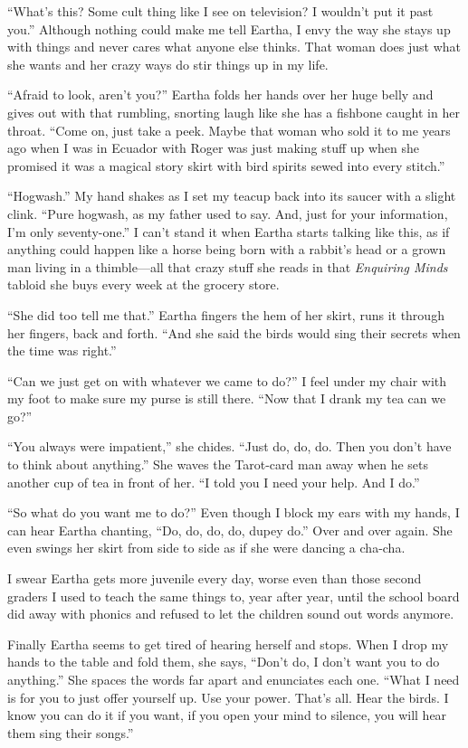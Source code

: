 \documentclass[twoside,10pt]{book}
\begin{document}
``What's this? Some cult thing like I see on television? I wouldn't put
it past you.'' Although nothing could make me tell Eartha, I envy the
way she stays up with things and never cares what any­one else thinks.
That woman does just what she wants and her crazy ways do stir things up
in my life.

``Afraid to look, aren't you?'' Eartha folds her hands over her huge
belly and gives out with that rumbling, snorting laugh like she has a
fishbone caught in her throat. ``Come on, just take a peek. Maybe that
woman who sold it to me years ago when I was in Ecuador with Roger was
just making stuff up when she promised it was a magical story skirt with
bird spirits sewed into every stitch.''

``Hogwash.'' My hand shakes as I set my teacup back into its saucer with
a slight clink. ``Pure hogwash, as my father used to say. And, just for
your information, I'm only seventy-one.'' I can't stand it when Eartha
starts talking like this, as if anything could happen like a horse being
born with a rabbit's head or a grown man living in a thimble---all that
crazy stuff she reads in that \emph{Enquiring Minds} tabloid she buys
every week at the grocery store.

``She did too tell me that.'' Eartha fingers the hem of her skirt, runs
it through her fingers, back and forth. ``And she said the birds would
sing their secrets when the time was right.''

``Can we just get on with whatever we came to do?'' I feel under my
chair with my foot to make sure my purse is still there. ``Now that I
drank my tea can we go?''

``You always were impatient,'' she chides. ``Just do, do, do. Then you
don't have to think about anything.'' She waves the Tarot-card man away
when he sets another cup of tea in front of her. ``I told you I need
your help. And I do.''

``So what do you want me to do?'' Even though I block my ears with my
hands, I can hear Eartha chanting, ``Do, do, do, do, dupey do.'' Over
and over again. She even swings her skirt from side to side as if she
were dancing a cha-cha.

I swear Eartha gets more juvenile every day, worse even than those
second graders I used to teach the same things to, year after year,
until the school board did away with phonics and refused to let the
children sound out words anymore.

Finally Eartha seems to get tired of hearing herself and stops. When I
drop my hands to the table and fold them, she says, ``Don't do, I don't
want you to do anything.'' She spaces the words far apart and enunciates
each one. ``What I need is for you to just offer yourself up. Use your
power. That's all. Hear the birds. I know you can do it if you want, if
you open your mind to silence, you will hear them sing their songs.''
\end{document}
